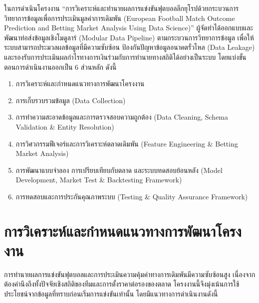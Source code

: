 
ในการดำเนินโครงงาน ``การวิเคราะห์และทำนายผลการแข่งขันฟุตบอลลีกยุโรปด้วยกระบวนการวิทยาการข้อมูลเพื่อการประเมินมูลค่าการเดิมพัน (European Football Match Outcome Prediction and Betting Market Analysis Using Data Science)'' ผู้จัดทำได้ออกแบบและพัฒนาท่อส่งข้อมูลเชิงโมดูลาร์ (Modular Data Pipeline) ตามกระบวนการวิทยาการข้อมูล เพื่อให้ระบบสามารถประมวลผลข้อมูลที่มีความซับซ้อน ป้องกันปัญหาข้อมูลอนาคตรั่วไหล (Data Leakage) และรองรับการประเมินผลกำไรทางการเงินร่วมกับการทำนายทางสถิติได้อย่างเป็นระบบ โดยแบ่งขั้นตอนการดำเนินงานออกเป็น 6 ส่วนหลัก ดังนี้

\begin{enumerate}[label=\arabic*)]
    \item การวิเคราะห์และกำหนดแนวทางการพัฒนาโครงงาน
    \item การเก็บรวบรวมข้อมูล (Data Collection)
    \item การทำความสะอาดข้อมูลและการตรวจสอบความถูกต้อง (Data Cleaning, Schema Validation \& Entity Resolution)
    \item การวิศวกรรมฟีเจอร์และการวิเคราะห์ตลาดเดิมพัน (Feature Engineering \& Betting Market Analysis)
    \item การพัฒนาแบบจำลอง การเปรียบเทียบกับตลาด และระบบทดสอบย้อนหลัง (Model Development, Market Test \& Backtesting Framework)
    \item การทดสอบและการประกันคุณภาพระบบ (Testing \& Quality Assurance Framework)
\end{enumerate}

\section{การวิเคราะห์และกำหนดแนวทางการพัฒนาโครงงาน}

การทำนายผลการแข่งขันฟุตบอลและการประเมินความคุ้มค่าทางการเดิมพันมีความซับซ้อนสูง เนื่องจากต้องคำนึงถึงทั้งปัจจัยเชิงสถิติของทีมและการตั้งราคาต่อรองของตลาด โครงงานนี้จึงมุ่งเน้นการใช้ประโยชน์จากข้อมูลที่ทราบก่อนเริ่มการแข่งขันเท่านั้น โดยมีแนวทางการดำเนินงานดังนี้

